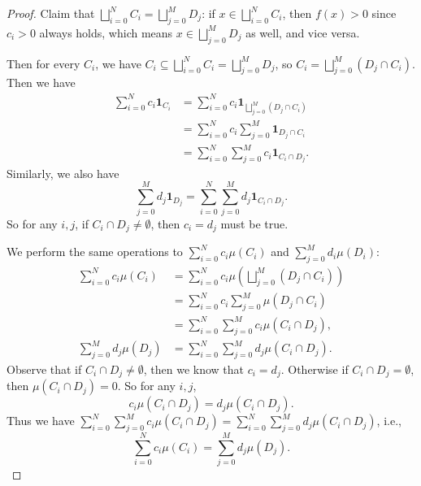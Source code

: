 \documentclass[a4paper, linespread=1.5]{article}
\newcommand{\IndicatorFunc}[1]{\mathbf{1}_{#1}}
\begin{document}
\begin{proof}
            Claim that $\bigsqcup_{i = 0}^N C_i = \bigsqcup_{j = 0}^M D_j$: if $x \in \bigsqcup_{i = 0}^N C_i$, then $f(x) > 0$ since $c_i > 0$ always holds, which means $x \in \bigsqcup_{j = 0}^M D_j$ as well, and vice versa.
            
            Then for every $C_i$, we have $C_i \subseteq \bigsqcup_{i = 0}^N C_i = \bigsqcup_{j = 0}^M D_j$, so $C_i = \bigsqcup_{j = 0}^M (D_j \cap C_i)$. Then we have
            \begin{align*}
            \sum_{i = 0}^N c_i\IndicatorFunc{C_i} &= \sum_{i = 0}^N c_i\IndicatorFunc{\bigsqcup_{j = 0}^M(D_j \cap C_i)} \\
            &= \sum_{i = 0}^N c_i \sum_{j = 0}^M \IndicatorFunc{D_j \cap C_i} \\
            &= \sum_{i = 0}^N \sum_{j = 0}^M c_i\IndicatorFunc{C_i \cap D_j}.
            \end{align*}
            Similarly, we also have
            $$
            \sum_{j = 0}^M d_j\IndicatorFunc{D_j} = \sum_{i = 0}^N \sum_{j = 0}^M d_j\IndicatorFunc{C_i \cap D_j}.
            $$
            So for any $i, j$, if $C_i \cap D_j \neq \emptyset$, then $c_i = d_j$ must be true.
            
            We perform the same operations to $\sum_{i = 0}^N c_i\mu(C_i)$ and $\sum_{j = 0}^M d_i\mu(D_i)$:
            \begin{align*}
            \sum_{i = 0}^N c_i\mu(C_i) &= \sum_{i = 0}^N c_i \mu(\bigsqcup_{j = 0}^M (D_j \cap C_i)) \\
            &= \sum_{i = 0}^N c_i \sum_{j = 0}^M \mu(D_j \cap C_i) \\
            &= \sum_{i = 0}^N \sum_{j = 0}^M c_i \mu(C_i \cap D_j), \\
            \sum_{j = 0}^M d_j\mu(D_j) &= \sum_{i = 0}^N \sum_{j = 0}^M d_j \mu(C_i \cap D_j).
            \end{align*}
            Observe that if $C_i \cap D_j \neq \emptyset$, then we know that $c_i = d_j$. Otherwise if $C_i \cap D_j = \emptyset$, then $\mu(C_i \cap D_j) = 0$. So for any $i, j$,
            $$
            c_i \mu(C_i \cap D_j) = d_j \mu(C_i \cap D_j).
            $$
            Thus we have $\sum_{i = 0}^N \sum_{j = 0}^M c_i \mu(C_i \cap D_j) = \sum_{i = 0}^N \sum_{j = 0}^M d_j \mu(C_i \cap D_j)$, i.e.,
            $$
            \sum_{i = 0}^N c_i\mu(C_i) = \sum_{j = 0}^M d_j\mu(D_j).
            $$
        \end{proof}
\end{document}
